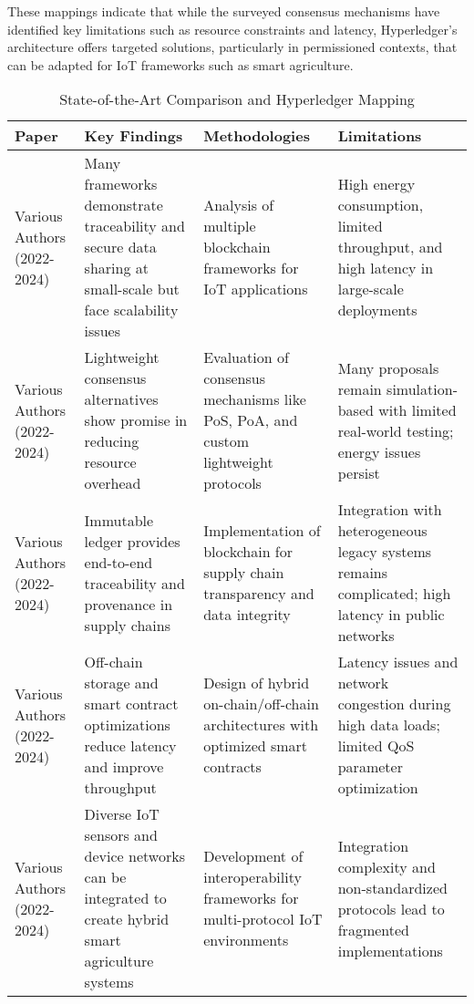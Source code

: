 \documentclass[12pt,onecolumn]{IEEEtran} %
\newcommand{\fitToPage}[1]{\begin{adjustbox}{max width=\textwidth}#1\end{adjustbox}}
\renewcommand{\arraystretch}{1.2} %
\begin{document}
These mappings indicate that while the surveyed consensus mechanisms have identified key limitations such as resource constraints and latency, Hyperledger's architecture offers targeted solutions, particularly in permissioned contexts, that can be adapted for IoT frameworks such as smart agriculture.
\begin{table}[H]
\caption{State-of-the-Art Comparison and Hyperledger Mapping}
\label{table5}
\centering
\fitToPage{
\begingroup
\setlength{\tabcolsep}{4pt}
\renewcommand{\arraystretch}{1.15}
\footnotesize
\begin{tabularx}{\textwidth}{@{}P{0.18\textwidth}YYY@{}}
\toprule
\textbf{Paper} & \textbf{Key Findings} & \textbf{Methodologies} & \textbf{Limitations} \\
\midrule
Various Authors (2022-2024) & Many frameworks demonstrate traceability and secure data sharing at small-scale but face scalability issues & Analysis of multiple blockchain frameworks for IoT applications & High energy consumption, limited throughput, and high latency in large-scale deployments \\
\addlinespace
Various Authors (2022-2024) & Lightweight consensus alternatives show promise in reducing resource overhead & Evaluation of consensus mechanisms like PoS, PoA, and custom lightweight protocols & Many proposals remain simulation-based with limited real-world testing; energy issues persist \\
\addlinespace
Various Authors (2022-2024) & Immutable ledger provides end-to-end traceability and provenance in supply chains & Implementation of blockchain for supply chain transparency and data integrity & Integration with heterogeneous legacy systems remains complicated; high latency in public networks \\
\addlinespace
Various Authors (2022-2024) & Off-chain storage and smart contract optimizations reduce latency and improve throughput & Design of hybrid on-chain/off-chain architectures with optimized smart contracts & Latency issues and network congestion during high data loads; limited QoS parameter optimization \\
\addlinespace
Various Authors (2022-2024) & Diverse IoT sensors and device networks can be integrated to create hybrid smart agriculture systems & Development of interoperability frameworks for multi-protocol IoT environments & Integration complexity and non-standardized protocols lead to fragmented implementations \\
\bottomrule
\end{tabularx}
\endgroup
}
\end{table}
\end{document}
